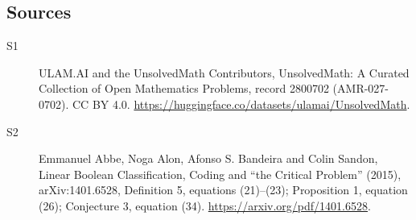 \documentclass[11pt]{article}
\begin{document}
\subsection{Sources}
\begin{description}
\item[\hypertarget{source:2800702:1}{S1}] ULAM.AI and the UnsolvedMath Contributors, UnsolvedMath: A Curated Collection of Open Mathematics Problems, record 2800702 (AMR-027-0702). CC BY 4.0. \url{https://huggingface.co/datasets/ulamai/UnsolvedMath}.
\item[\hypertarget{source:2800702:2}{S2}] Emmanuel Abbe, Noga Alon, Afonso S. Bandeira and Colin Sandon, Linear Boolean Classification, Coding and “the Critical Problem” (2015), arXiv:1401.6528, Definition 5, equations (21)–(23); Proposition 1, equation (26); Conjecture 3, equation (34). \url{https://arxiv.org/pdf/1401.6528}.
\end{description}
\label{end:2800702}
\end{document}
